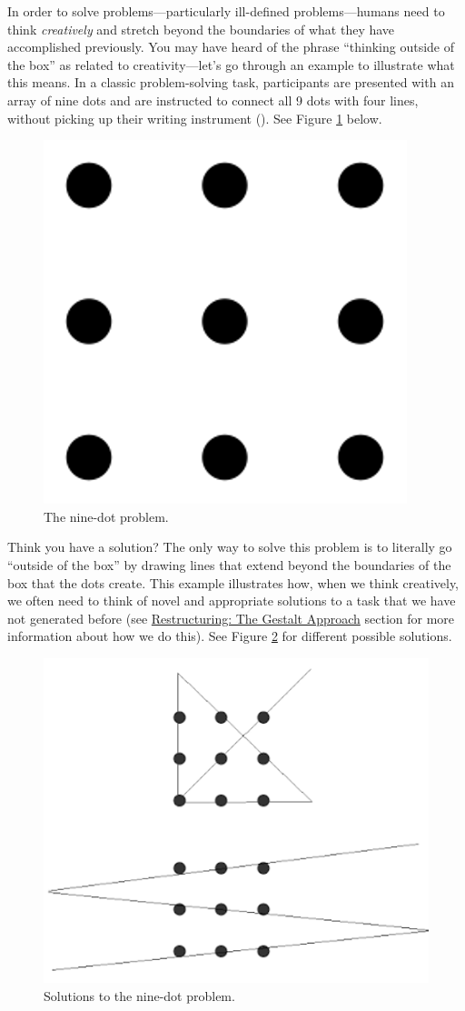 \documentclass[
]{krantz}
\begin{document}
In order to solve problems---particularly ill-defined problems---humans need to think \emph{creatively} and stretch beyond the boundaries of what they have accomplished previously. You may have heard of the phrase ``thinking outside of the box'' as related to creativity---let's go through an example to illustrate what this means. In a classic problem-solving task, participants are presented with an array of nine dots and are instructed to connect all 9 dots with four lines, without picking up their writing instrument (). See Figure \ref{fig:ninedot} below.

\begin{figure}

{\centering \includegraphics[width=0.4\linewidth]{images/ch10/ninedot} 

}

\caption{The nine-dot problem.}\label{fig:ninedot}
\end{figure}

Think you have a solution? The only way to solve this problem is to literally go ``outside of the box'' by drawing lines that extend beyond the boundaries of the box that the dots create. This example illustrates how, when we think creatively, we often need to think of novel and appropriate solutions to a task that we have not generated before (see \hyperref[restructuring-the-gestalt-approach]{Restructuring: The Gestalt Approach} section for more information about how we do this). See Figure \ref{fig:ninedotsolution} for different possible solutions.

\begin{figure}

{\centering \includegraphics[width=0.4\linewidth]{images/ch10/ninedotsolution} 

}

\caption{Solutions to the nine-dot problem.}\label{fig:ninedotsolution}
\end{figure}
\end{document}
